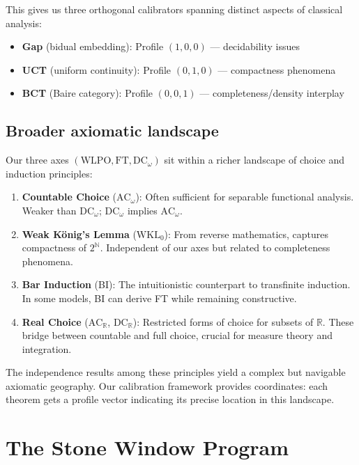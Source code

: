 \documentclass[11pt]{article}
\newcommand{\WLPO}{\mathrm{WLPO}}
\newcommand{\FT}{\mathrm{FT}}
\newcommand{\DCw}{\mathrm{DC}_\omega}
\newcommand{\ACw}{\mathrm{AC}_\omega}
\newcommand{\ACR}{\mathrm{AC}_{\mathbb{R}}}
\newcommand{\DCR}{\mathrm{DC}_{\mathbb{R}}}
\newcommand{\WKLz}{\mathrm{WKL}_0}
\begin{document}
This gives us three orthogonal calibrators spanning distinct aspects of classical analysis:
\begin{itemize}
\item \textbf{Gap} (bidual embedding): Profile $(1, 0, 0)$ — decidability issues
\item \textbf{UCT} (uniform continuity): Profile $(0, 1, 0)$ — compactness phenomena  
\item \textbf{BCT} (Baire category): Profile $(0, 0, 1)$ — completeness/density interplay
\end{itemize}

\subsection{Broader axiomatic landscape}

Our three axes $(\WLPO, \FT, \DCw)$ sit within a richer landscape of choice and induction principles:

\begin{enumerate}
\item \textbf{Countable Choice} ($\ACw{}$): Often sufficient for separable functional analysis. Weaker than $\DCw{}$; $\DCw{}$ implies $\ACw{}$.

\item \textbf{Weak König's Lemma} ($\WKLz{}$): From reverse mathematics, captures compactness of $2^{\mathbb{N}}$. Independent of our axes but related to completeness phenomena.

\item \textbf{Bar Induction} (BI): The intuitionistic counterpart to transfinite induction. In some models, BI can derive FT while remaining constructive.

\item \textbf{Real Choice} ($\ACR$, $\DCR$): Restricted forms of choice for subsets of $\mathbb{R}$. These bridge between countable and full choice, crucial for measure theory and integration.
\end{enumerate}

The independence results among these principles yield a complex but navigable axiomatic geography. Our calibration framework provides coordinates: each theorem gets a profile vector indicating its precise location in this landscape.

\section{The Stone Window Program}
\end{document}
